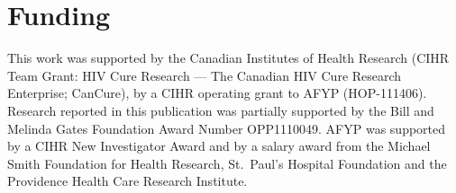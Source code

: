 \documentclass{bioinfo}
\begin{document}
\vspace*{-18pt}

\section*{Funding} \label{sec:fund}
This work was supported by the Canadian Institutes of Health Research (CIHR Team Grant: HIV Cure Research --- The Canadian HIV Cure Research Enterprise; CanCure), by a CIHR operating grant to AFYP (HOP-111406).
Research reported in this publication was partially supported by the Bill and Melinda Gates Foundation Award Number OPP1110049.
AFYP was supported by a CIHR New Investigator Award and by a salary award from the Michael Smith Foundation for Health Research, St.~Paul's Hospital Foundation and the Providence Health Care Research Institute.

\vspace*{-20pt}
\end{document}
